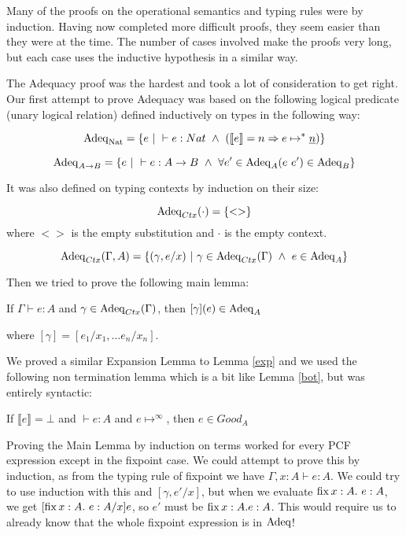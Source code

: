 Many of the proofs on the operational semantics and typing rules were by induction. Having now completed more difficult proofs, they seem easier than they were at the time. The number of cases involved make the proofs very long, but each case uses the inductive hypothesis in a similar way.  

The Adequacy proof was the hardest and took a lot of consideration to get right. Our first attempt to prove Adequacy was based on the following logical predicate (unary logical relation) defined inductively on types in the following way:

\[\operatorname{Adeq}_{\operatorname{Nat}} = \{e  \ | \ \vdash e : Nat \ \wedge \ (\llbracket e \rrbracket = n \Rightarrow e \mapsto^* \underline{n}) \} \]

\[\operatorname{Adeq}_{A \to B} = \{ e \ | \  \vdash e : A \to B \ \wedge \ \forall e' \in \operatorname{Adeq}_A (e \ e') \in \operatorname{Adeq}_B \}\]

It was also defined on typing contexts by induction on their size:

\[\operatorname{Adeq}_{Ctx} (\cdot) = \{ <>\} \]
where $<>$ is the empty substitution and $\cdot$ is the empty context.

\[\operatorname{Adeq}_{Ctx}(\Gamma, A) = \{ (\gamma, e/x) \ | \ \gamma \in \operatorname{Adeq}_{Ctx}(\Gamma) \ \wedge \ e \in \operatorname{Adeq}_A\} \]

Then we tried to prove the following main lemma:

\vspace{0.5cm}

\begin{lem}
If $\Gamma \vdash e:A$ and $\gamma \in \operatorname{Adeq}_{Ctx}(\Gamma)$, then $[\gamma](e) \in \operatorname{Adeq}_A$
\end{lem}

where $[\gamma] = [e_1/x_1, \dots e_n/x_n]$.

We proved a similar Expansion Lemma to Lemma \ref{exp} and we used the following non termination lemma which is a bit like Lemma \ref{bot}, but was entirely syntactic:

\vspace{0.5cm}

\begin{lem}
If $\llbracket e \rrbracket = \bot$ and $\vdash e : A$ and $e \mapsto^{\infty}$, then $e \in Good_A$
\end{lem}

Proving the Main Lemma by induction on terms worked for every PCF expression except in the fixpoint case. We could attempt to prove this by induction, as from the typing rule of fixpoint we have $\Gamma, x : A \vdash e : A$. We could try to use induction with this and  $[\gamma, e'/x]$, but when we evaluate $\operatorname{fix} x: A . \ e : A$, we get $[\operatorname{fix} x:A. \ e: A/ x]e$, so  $e'$ must be $\operatorname{fix} x:A. e : A$. This would require us to already know that the whole fixpoint expression is in $\operatorname{Adeq}$!

